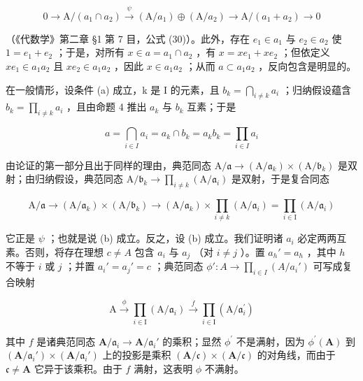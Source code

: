 \[
0 \longrightarrow \mathrm{A} / (a _ {1} \cap a _ {2}) \stackrel {\psi} {\longrightarrow} (\mathrm{A} / a _ {1}) \oplus (\mathrm{A} / a _ {2}) \longrightarrow \mathrm{A} / (a _ {1} + a _ {2}) \longrightarrow 0
\]

（《代数学》第二章 §1 第 7 目，公式 (30)）。此外，存在 \(e_1 \in a_1\) 与 \(e_2 \in a_2\) 使 \(1 = e_1 + e_2\) ；于是，对所有 \(x \in a = a_1 \cap a_2\) ，有 \(x = xe_1 + xe_2\) ；但依定义 \(xe_1 \in a_1a_2\) 且 \(xe_2 \in a_1a_2\) ，因此 \(x \in a_1a_2\) ；从而 \(a \subset a_1a_2\) ，反向包含是明显的。

在一般情形，设条件 (a) 成立，k 是 I 的元素，且 \(b_{k} = \bigcap_{i \neq k} a_{i}\) ；归纳假设蕴含 \(b_{k} = \prod_{i \neq k} a_{i}\) ，且由命题 4 推出 \(a_{k}\) 与 \(b_{k}\) 互素；于是

\[
a = \bigcap_ {i \in I} a _ {i} = a _ {k} \cap b _ {k} = a _ {k} b _ {k} = \prod_ {i \in I} a _ {i}
\]

由论证的第一部分且出于同样的理由，典范同态 \(\mathrm{A}/\mathfrak{a}\to(\mathrm{A}/\mathfrak{a}_{k})\times(\mathrm{A}/\mathfrak{b}_{k})\) 是双射；由归纳假设，典范同态 \(\mathrm{A}/\mathfrak{b}_{k}\to\prod_{i\neq k}(\mathrm{A}/\mathfrak{a}_{i})\) 是双射，于是复合同态

\[
\mathrm{A} / \mathfrak {a} \rightarrow (\mathrm{A} / \mathfrak {a} _ {k}) \times (\mathrm{A} / \mathfrak {b} _ {k}) \rightarrow (\mathrm{A} / \mathfrak {a} _ {k}) \times \prod_ {i \neq k} (\mathrm{A} / \mathfrak {a} _ {i}) = \prod_ {i \in \mathrm{I}} (\mathrm{A} / \mathfrak {a} _ {i})
\]

它正是 \(\psi\) ；也就是说 (b) 成立。反之，设 (b) 成立。我们证明诸 \(a_i\) 必定两两互素。否则，将存在理想 \(c \neq A\) 包含 \(a_i\) 与 \(a_j\) （对 \(i \neq j\) ）。置 \(a_h' = a_h\) ，其中 \(h\) 不等于 \(i\) 或 \(j\) ；并置 \(a_i' = a_j' = c\) ；典范同态 \(\phi': A \to \prod_{i \in I} (A / a_i')\) 可写成复合映射

\[
\mathrm{A} \xrightarrow {\phi} \prod_ {i \in \mathrm{I}} (\mathrm{A} / \mathfrak {a} _ {i}) \xrightarrow {f} \prod_ {i \in \mathrm{I}} (\mathrm{A} / \mathfrak {a} _ {i} ^ {\prime})
\]

其中 \(f\) 是诸典范同态 \(\mathbf{A} / \mathfrak{a}_i\to \mathbf{A} / \mathfrak{a}_i'\) 的乘积；显然 \(\phi^{\prime}\) 不是满射，因为 \(\phi^{\prime}(\mathbf{A})\) 到 \((\mathbf{A} / \mathfrak{a}_i')\times (\mathbf{A} / \mathfrak{a}_i')\) 上的投影是乘积 \((\mathbf{A} / \mathfrak{c})\times (\mathbf{A} / \mathfrak{c})\) 的对角线，而由于 \(\mathfrak{c}\neq \mathbf{A}\) 它异于该乘积。由于 \(f\) 满射，这表明 \(\phi\) 不满射。

